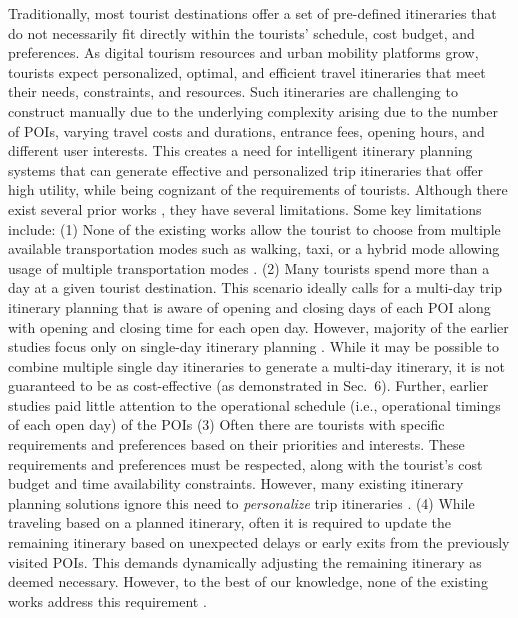 Traditionally, most tourist destinations offer a set of pre-defined itineraries
that do not necessarily fit directly within the tourists' schedule, cost budget,
and preferences. As digital tourism resources and urban mobility platforms grow,
tourists expect personalized, optimal, and efficient travel itineraries that
meet their needs, constraints, and resources. Such itineraries are challenging
to construct manually due to the underlying complexity arising due to the number
of POIs, varying travel costs and durations, entrance fees, opening hours, and
different user interests. This creates a need for intelligent
itinerary planning systems that can generate effective and personalized trip
itineraries that offer high utility, while being cognizant of the requirements
of tourists. Although there exist several prior works \cite{chen2014automatic,
vanzelst2016itinerary, taylor2018tour, vu2022branch,
panagiotakis2024expectation, liu2024personalized, rambha2024optimized,
lim2018personalized, bolzoni2014efficient}, they have several limitations. Some
key limitations include: (1) None of the existing works allow the tourist to
choose from multiple available transportation modes such as walking, taxi, or a
hybrid mode allowing usage of multiple transportation modes
\cite{chen2014automatic, taylor2018tour, vanzelst2016itinerary}. (2) Many
tourists spend more than a day at a given tourist destination. This scenario
ideally calls for a multi-day trip itinerary planning that is aware of opening
and closing days of each POI along with opening and closing time for each open
day. However, majority of the earlier studies focus only on single-day itinerary
planning \cite{taylor2018tour, vu2022branch, panagiotakis2024expectation}.
While it may be possible to combine multiple single day itineraries to generate
a multi-day itinerary, it is not guaranteed to be as cost-effective (as
demonstrated in Sec.~6). Further, earlier studies paid little attention to the
operational schedule (i.e., operational timings of each open day) of the POIs
\cite{chen2014automatic, vanzelst2016itinerary, taylor2018tour} (3) Often there
are tourists with specific requirements and preferences based on their
priorities and interests. These requirements and preferences must be respected,
along with the tourist's cost budget and time availability constraints. However,
many existing itinerary planning solutions ignore this need to
\emph{personalize} trip itineraries \cite{rambha2024optimized, yu2017mining,
rani2018development, yu2014optimal}. (4) While traveling based on a planned
itinerary, often it is required to update the remaining itinerary based on
unexpected delays or early exits from the previously visited POIs. This demands
dynamically adjusting the remaining itinerary as deemed necessary. However, to
the best of our knowledge, none of the existing works address this requirement
\cite{chen2014automatic, taylor2018tour, vanzelst2016itinerary}.

